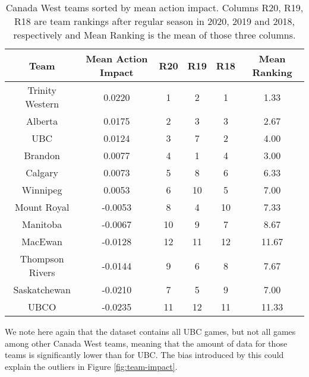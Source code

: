 \documentclass{sfuthesis}
\begin{document}
	\begin{table}[ht]
		\centering
		\begin{tabular}{cccccc}
			\textbf{Team}   & \textbf{Mean Action Impact} & \textbf{R20} & \textbf{R19} & \textbf{R18} & \textbf{Mean Ranking} \\ \hline
			Trinity Western & 0.0220                      & 1            & 2            & 1            & 1.33                  \\
			Alberta         & 0.0175                      & 2            & 3            & 3            & 2.67                  \\
			UBC             & 0.0124                      & 3            & 7            & 2            & 4.00                  \\
			Brandon         & 0.0077                      & 4            & 1            & 4            & 3.00                  \\
			Calgary         & 0.0073                      & 5            & 8            & 6            & 6.33                  \\
			Winnipeg        & 0.0053                      & 6            & 10           & 5            & 7.00                  \\
			Mount Royal     & -0.0053                     & 8            & 4            & 10           & 7.33                  \\
			Manitoba        & -0.0067                     & 10           & 9            & 7            & 8.67                  \\
			MacEwan         & -0.0128                     & 12           & 11           & 12           & 11.67                 \\
			Thompson Rivers & -0.0144                     & 9            & 6            & 8            & 7.67                  \\
			Saskatchewan    & -0.0210                     & 7            & 5            & 9            & 7.00                  \\
			UBCO            & -0.0235                     & 11           & 12           & 11           & 11.33                
		\end{tabular}
		\caption{Canada West teams sorted by mean action impact. Columns R20, R19, R18 are team rankings after regular season in 2020, 2019 and 2018, respectively and Mean Ranking is the mean of those three columns.}
		\label{tab:team-impact}
	\end{table}
	We note here again that the dataset contains all UBC games, but not all games among other Canada West teams, meaning that the amount of data for those teams is significantly lower than for UBC. The bias introduced by this could explain the outliers in Figure \ref{fig:team-impact}.\\
\end{document}
